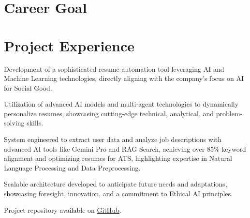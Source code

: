 \begin{minipage}[t]{0.36\textwidth}
    
\end{minipage} \hfill \begin{minipage}[t]{0.63\textwidth}

    \section{Career Goal} 
      \betweensummaryPointsionVSpace
    \sectionsep

  \section{Project Experience}
    
    \vspace{15pt} %
    
    \begin{tightemize}
      \item Development of a sophisticated resume automation tool leveraging AI and Machine Learning technologies, directly aligning with the company's focus on AI for Social Good.
      \item Utilization of advanced AI models and multi-agent technologies to dynamically personalize resumes, showcasing cutting-edge technical, analytical, and problem-solving skills.
      \item System engineered to extract user data and analyze job descriptions with advanced AI tools like Gemini Pro and RAG Search, achieving over 85\% keyword alignment and optimizing resumes for ATS, highlighting expertise in Natural Language Processing and Data Preprocessing.
      \item Scalable architecture developed to anticipate future needs and adaptations, showcasing foresight, innovation, and a commitment to Ethical AI principles.
      \item Project repository available on \href{https://github.com/vmsaif/ats-pass-ai}{\underline{GitHub}}.
    \end{tightemize}
  \sectionsep


\end{minipage}
